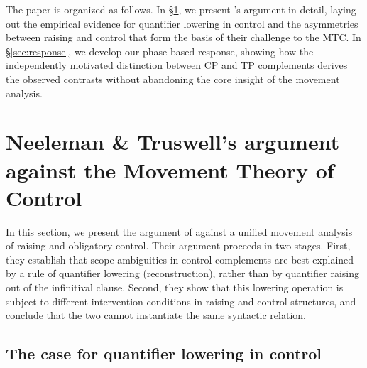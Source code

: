 \documentclass[12pt]{article}
\begin{document}
The paper is organized as follows. In \S\ref{sec:nt}, we present \citeauthor{neeleman2006}'s argument in detail, laying out the empirical evidence for quantifier lowering in control and the asymmetries between raising and control that form the basis of their challenge to the MTC. In \S\ref{sec:response}, we develop our phase-based response, showing how the independently motivated distinction between CP and TP complements derives the observed contrasts without abandoning the core insight of the movement analysis.

\section{Neeleman \& Truswell's argument against the Movement Theory of Control}\label{sec:nt}

In this section, we present the argument of \citet{neeleman2006} against a unified movement analysis of raising and obligatory control. Their argument proceeds in two stages. First, they establish that scope ambiguities in control complements are best explained by a rule of quantifier lowering (reconstruction), rather than by quantifier raising out of the infinitival clause. Second, they show that this lowering operation is subject to different intervention conditions in raising and control structures, and conclude that the two cannot instantiate the same syntactic relation.

\subsection{The case for quantifier lowering in control}\label{sec:nt-lowering}
\end{document}
